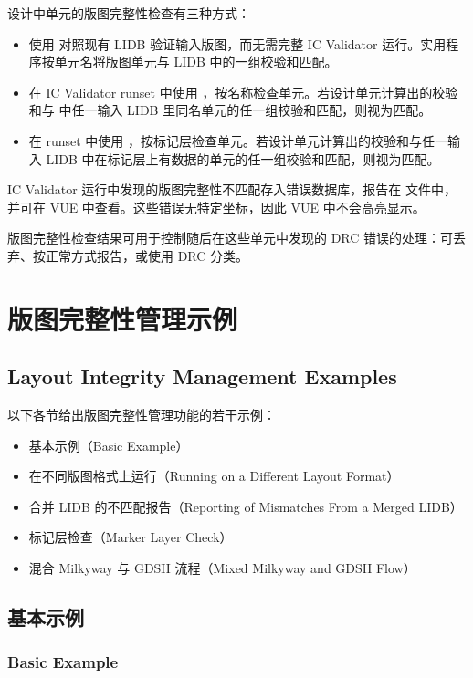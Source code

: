 设计中单元的版图完整性检查有三种方式：
\begin{itemize}
  \item 使用  对照现有 LIDB 验证输入版图，而无需完整 IC Validator 运行。实用程序按单元名将版图单元与 LIDB 中的一组校验和匹配。
  \item 在 IC Validator runset 中使用 ，按名称检查单元。若设计单元计算出的校验和与  中任一输入 LIDB 里同名单元的任一组校验和匹配，则视为匹配。
  \item 在 runset 中使用 ，按标记层检查单元。若设计单元计算出的校验和与任一输入 LIDB 中在标记层上有数据的单元的任一组校验和匹配，则视为匹配。
\end{itemize}

IC Validator 运行中发现的版图完整性不匹配存入错误数据库，报告在  文件中，并可在 VUE 中查看。这些错误无特定坐标，因此 VUE 中不会高亮显示。

版图完整性检查结果可用于控制随后在这些单元中发现的 DRC 错误的处理：可丢弃、按正常方式报告，或使用 DRC 分类。

\section{版图完整性管理示例}
\subsection*{Layout Integrity Management Examples}

以下各节给出版图完整性管理功能的若干示例：
\begin{itemize}
  \item 基本示例（Basic Example）
  \item 在不同版图格式上运行（Running on a Different Layout Format）
  \item 合并 LIDB 的不匹配报告（Reporting of Mismatches From a Merged LIDB）
  \item 标记层检查（Marker Layer Check）
  \item 混合 Milkyway 与 GDSII 流程（Mixed Milkyway and GDSII Flow）
\end{itemize}

\subsection{基本示例}
\subsubsection*{Basic Example}

